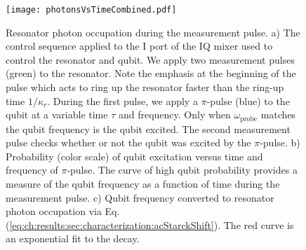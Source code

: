 \begin{figure}
\begin{centering}
\texttt{[image: photonsVsTimeCombined.pdf]}
\par\end{centering}
\caption{Resonator photon occupation during the measurement pulse.
a) The control sequence applied to the I port of the IQ mixer used to control the resonator and qubit.
We apply two measurement pulses (green) to the resonator.
Note the emphasis at the beginning of the pulse which acts to ring up the resonator faster than the ring-up time $1/\kappa_r$.
During the first pulse, we apply a $\pi$-pulse (blue) to the qubit at a variable time $\tau$ and frequency.
Only when $\omega_{\text{probe}}$ matches the qubit frequency is the qubit excited.
The second measurement pulse checks whether or not the qubit was excited by the $\pi$-pulse.
b) Probability (color scale) of qubit excitation versus time and frequency of $\pi$-pulse.
The curve of high qubit probability provides a measure of the qubit frequency as a function of time during the measurement pulse.
c) Qubit frequency converted to resonator photon occupation via Eq.\,(\ref{eq:ch:results:sec:characterization:acStarckShift}).
The red curve is an exponential fit to the decay.}
\label{Fig:ch:results:sec:characterization:photonsVsTime}
\end{figure}
